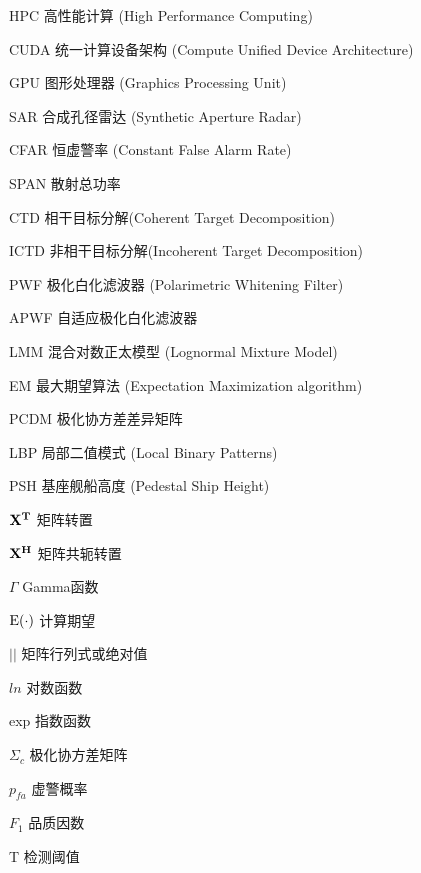 \begin{denotation}[3cm]
\item[HPC] 高性能计算 (High Performance Computing)
\item[CUDA] 统一计算设备架构 (Compute Unified Device Architecture)
\item[GPU] 图形处理器 (Graphics Processing Unit)
\item[SAR] 合成孔径雷达 (Synthetic Aperture Radar)
\item[CFAR] 恒虚警率 (Constant False Alarm Rate)
\item[SPAN] 散射总功率
\item[CTD] 相干目标分解(Coherent Target Decomposition)
\item[ICTD] 非相干目标分解(Incoherent Target Decomposition)
\item[PWF] 极化白化滤波器 (Polarimetric Whitening Filter)
\item[APWF] 自适应极化白化滤波器
\item[LMM] 混合对数正太模型 (Lognormal Mixture Model)
\item[EM] 最大期望算法 (Expectation Maximization algorithm)
\item[PCDM] 极化协方差差异矩阵
\item[LBP] 局部二值模式 (Local Binary Patterns)
\item[PSH] 基座舰船高度 (Pedestal Ship Height)
\item[$\bf{X}^T$] 矩阵转置
\item[$\bf{X}^H$] 矩阵共轭转置
\item[$\Gamma$] Gamma函数 
\item[${\rm{E}}( \cdot )$] 计算期望
\item[$\left| {} \right|$] 矩阵行列式或绝对值
\item[$ln$] 对数函数
\item[exp] 指数函数  
\item[$\Sigma_c$]	极化协方差矩阵
\item[$p_{fa}$] 虚警概率
\item[$F_1$] 品质因数
\item[T] 检测阈值
\end{denotation}
